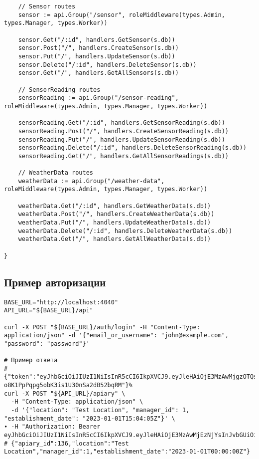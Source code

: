 \documentclass{article}
\begin{document}
\begin{lstlisting}
	// Sensor routes
	sensor := api.Group("/sensor", roleMiddleware(types.Admin, types.Manager, types.Worker))

	sensor.Get("/:id", handlers.GetSensor(s.db))
	sensor.Post("/", handlers.CreateSensor(s.db))
	sensor.Put("/", handlers.UpdateSensor(s.db))
	sensor.Delete("/:id", handlers.DeleteSensor(s.db))
	sensor.Get("/", handlers.GetAllSensors(s.db))

	// SensorReading routes
	sensorReading := api.Group("/sensor-reading", roleMiddleware(types.Admin, types.Manager, types.Worker))

	sensorReading.Get("/:id", handlers.GetSensorReading(s.db))
	sensorReading.Post("/", handlers.CreateSensorReading(s.db))
	sensorReading.Put("/", handlers.UpdateSensorReading(s.db))
	sensorReading.Delete("/:id", handlers.DeleteSensorReading(s.db))
	sensorReading.Get("/", handlers.GetAllSensorReadings(s.db))

	// WeatherData routes
	weatherData := api.Group("/weather-data", roleMiddleware(types.Admin, types.Manager, types.Worker))

	weatherData.Get("/:id", handlers.GetWeatherData(s.db))
	weatherData.Post("/", handlers.CreateWeatherData(s.db))
	weatherData.Put("/", handlers.UpdateWeatherData(s.db))
	weatherData.Delete("/:id", handlers.DeleteWeatherData(s.db))
	weatherData.Get("/", handlers.GetAllWeatherData(s.db))

}
\end{lstlisting}

\subsection{Пример авторизации}

\begin{lstlisting}
BASE_URL="http://localhost:4040"
API_URL="${BASE_URL}/api"

curl -X POST "${BASE_URL}/auth/login" -H "Content-Type: application/json" -d '{"email_or_username": "john@example.com", "password": "password"}'

# Пример ответа
# {"token":"eyJhbGciOiJIUzI1NiIsInR5cCI6IkpXVCJ9.eyJleHAiOjE3MzAwMjgzOTQsInJvbGUiOiJXT1JLRVIiLCJ1c2VyX2lkIjoxMDF9.8rim7ZBdT-o8K1PpPqpg5obK3is1U30nSa2dB52bqRM"}%
curl -X POST "${API_URL}/apiary" \
  -H "Content-Type: application/json" \
  -d '{"location": "Test Location", "manager_id": 1, "establishment_date": "2023-01-01T15:04:05Z"}' \
∙ -H "Authorization: Bearer eyJhbGciOiJIUzI1NiIsInR5cCI6IkpXVCJ9.eyJleHAiOjE3MzAwMjEzNjYsInJvbGUiOiJXT1JLRVIiLCJ1c2VyX2lkIjoxMDF9.JP_KvMOAyivc2rJQnhC_ajgrwy9cJPjfdynLC6KbNSk"
# {"apiary_id":136,"location":"Test Location","manager_id":1,"establishment_date":"2023-01-01T00:00:00Z"}
\end{lstlisting}
\end{document}
